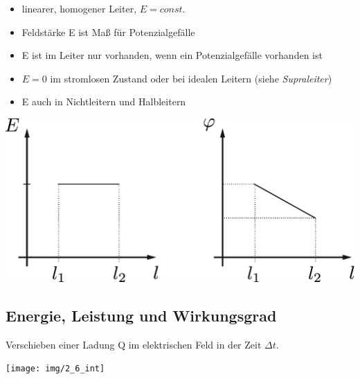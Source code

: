 \begin{minipage}{.5\textwidth}
	\begin{itemize}
		\item linearer, homogener Leiter, $E = const.$
		\item Feldstärke E ist Maß für Potenzialgefälle
		\item E ist im Leiter nur vorhanden, wenn ein Potenzialgefälle vorhanden ist
		\item $E = 0$ im stromlosen Zustand oder bei idealen Leitern (siehe \textit{Supraleiter})
		\item E auch in Nichtleitern und Halbleitern
	\end{itemize}
\end{minipage} \hfill
\begin{minipage}{.5\textwidth}
	\includegraphics[width=\textwidth]{img/2_5}
\end{minipage}

\subsection{Energie, Leistung und Wirkungsgrad}

Verschieben einer Ladung Q im elektrischen Feld in der Zeit $\Delta t$.

\begin{center}
\texttt{[image: img/2\_6\_int]}	
\end{center}
